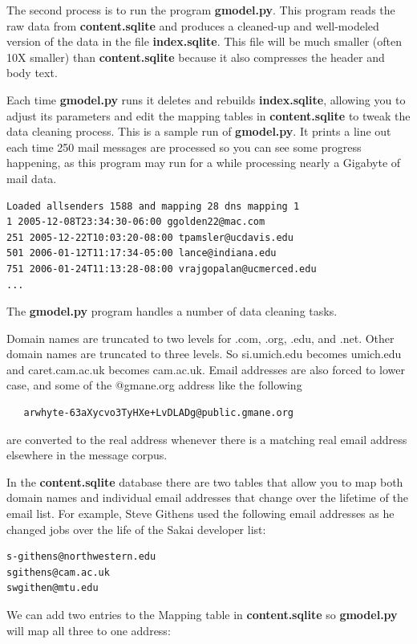 The second process is to run the program {\bf gmodel.py}.  This program reads the raw 
data from {\bf content.sqlite} and produces a cleaned-up and well-modeled version of the 
data in the file {\bf index.sqlite}.  This file will be much smaller (often 10X
smaller) than {\bf content.sqlite} because it also compresses the header and body text.

Each time {\bf gmodel.py} runs it deletes and rebuilds {\bf index.sqlite}, allowing
you to adjust its parameters and edit the mapping tables in {\bf content.sqlite} to tweak the 
data cleaning process. This is a sample run of {\bf gmodel.py}.  It prints a line out each time
250 mail messages are processed so you can see some progress happening, as this program may
run for a while processing nearly a Gigabyte of mail data.

\beforeverb
\begin{verbatim}
Loaded allsenders 1588 and mapping 28 dns mapping 1
1 2005-12-08T23:34:30-06:00 ggolden22@mac.com
251 2005-12-22T10:03:20-08:00 tpamsler@ucdavis.edu
501 2006-01-12T11:17:34-05:00 lance@indiana.edu
751 2006-01-24T11:13:28-08:00 vrajgopalan@ucmerced.edu
...
\end{verbatim}
\afterverb
%

The {\bf gmodel.py} program handles a number of data cleaning tasks.

Domain names are truncated to two levels for .com, .org, .edu, and .net.
Other domain names are truncated to three levels.  So si.umich.edu becomes
umich.edu and caret.cam.ac.uk becomes cam.ac.uk.   Email addresses are also
forced to lower case, and some of the @gmane.org address like the following

\beforeverb
\begin{verbatim}
   arwhyte-63aXycvo3TyHXe+LvDLADg@public.gmane.org
\end{verbatim}
\afterverb
%
are converted to the real address whenever there is a matching real email
address elsewhere in the message corpus.

In the {\bf content.sqlite} database there are two tables that allow
you to map both domain names and individual email addresses that change over 
the lifetime of the email list.  For example, Steve Githens used the following
email addresses as he changed jobs over the life of the Sakai developer list:

\beforeverb
\begin{verbatim}
s-githens@northwestern.edu
sgithens@cam.ac.uk
swgithen@mtu.edu
\end{verbatim}
\afterverb
%
We can add two entries to the Mapping table in {\bf content.sqlite} so 
{\bf gmodel.py} will map all three to one address:

